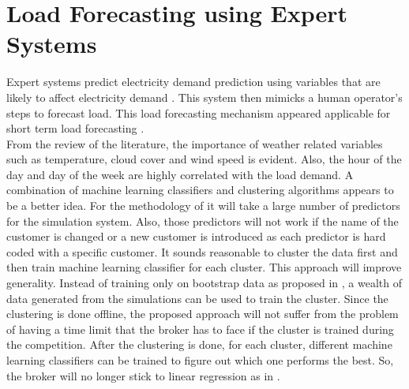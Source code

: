 \section{Load Forecasting using Expert Systems}

Expert systems predict electricity demand prediction using variables that are likely to affect electricity demand \cite{rahman1988expert, ho1990short}. This system then mimicks a human operator's steps to forecast load. This load forecasting mechanism appeared applicable for short term load forecasting \cite{rahman1988expert, ho1990short, moghram1989analysis}. \\

From the review of the literature, the importance of weather related variables such as temperature, cloud cover and wind speed is evident. Also, the hour of the day and day of the week are highly correlated with the load demand. A combination of machine learning classifiers and clustering algorithms appears to be a better idea. For the methodology of \cite{parra2013initial} it will take a large number of predictors for the simulation system. Also, those predictors will not work if the name of the customer is changed or a new customer is introduced as each predictor is hard coded with a specific customer. It sounds reasonable to cluster the data first and then train machine learning classifier for each cluster. This approach will improve generality. Instead of training only on bootstrap data as proposed in \cite{wang2015gongbroker}, a wealth of data generated from the simulations can be used to  train the cluster. Since the clustering is done offline, the proposed approach will not  suffer from the problem of having a time limit that the broker has to face if the cluster is trained during the competition. After the clustering is done, for each cluster, different machine learning classifiers can be trained to figure out which one performs the best. So, the broker will no longer stick to linear regression as in \cite{wang2015gongbroker}.

